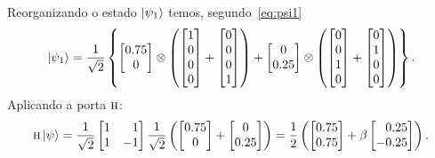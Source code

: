 Reorganizando o estado $\ket{\psi_1}$ temos, segundo~\eqref{eq:psi1}
\begin{equation}
  \ket{\psi_1} = \frac{1}{\sqrt{2}} \left\{ \begin{bmatrix} \num{0.75} \\ 0 \end{bmatrix} \otimes
    \left(
      \begin{bmatrix} 1 \\ 0 \\ 0 \\ 0 \end{bmatrix} +
      \begin{bmatrix} 0 \\ 0 \\ 0 \\ 1 \end{bmatrix}
    \right) +
    \begin{bmatrix} 0 \\ \num{0.25} \end{bmatrix} \otimes
    \left(
      \begin{bmatrix} 0 \\ 0 \\ 1 \\ 0 \end{bmatrix} +
      \begin{bmatrix} 0 \\ 1 \\ 0 \\ 0 \end{bmatrix}
    \right) \right\}.
\end{equation}
Aplicando a porta \(\operatorname{\textsc{h}}\):
\begin{equation}
  \HAD \ket{\psi} = \frac{1}{\sqrt{2}}
  \begin{bmatrix*}[r] 1 & 1 \\ 1 & -1 \end{bmatrix*}
  \frac{1}{\sqrt{2}}\left(
    \begin{bmatrix} \num{0.75} \\ 0 \end{bmatrix} +
    \begin{bmatrix} 0 \\ \num{0.25} \end{bmatrix} \right) =
  \frac{1}{2} \left( \begin{bmatrix} \num{0.75} \\ \num{0.75} \end{bmatrix} +
    \beta \begin{bmatrix*}[r] \num{0.25} \\ -\num{0.25} \end{bmatrix*} \right).
\end{equation}

